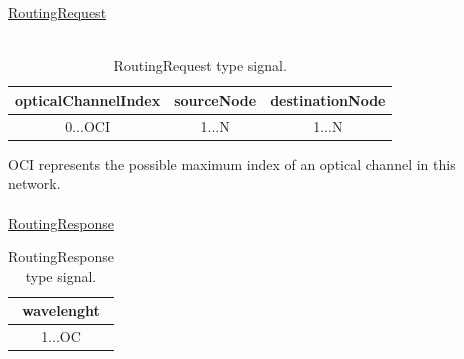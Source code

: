 \underline{RoutingRequest}\\
\\
\begin{table}[H]
	\centering
	\begin{tabular}{|c|c|c|}
		\hline
		opticalChannelIndex & sourceNode & destinationNode \\ \hline
		0...OCI              & 1...N      & 1...N           \\ \hline
	\end{tabular}
	\caption{RoutingRequest type signal.}
	\label{RoutingRequest}
\end{table}

OCI represents the possible maximum index of an optical channel in this network.\\ \\
\underline{RoutingResponse}\\
\begin{table}[H]
	\centering
\begin{tabular}{|c|}
	\hline
	wavelenght \\ \hline
	1...OC     \\ \hline
\end{tabular}
	\caption{RoutingResponse type signal.}
	\label{RoutingResponse}
\end{table}

